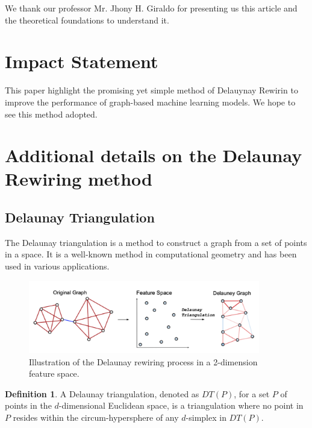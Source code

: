 \documentclass{article}
\theoremstyle{plain}
\theoremstyle{definition}
\newtheorem{definition}[theorem]{Definition}
\theoremstyle{remark}
\begin{document}
We thank our professor Mr. Jhony H. Giraldo for presenting us this article and 
the theoretical foundations to understand it.

\section*{Impact Statement}

This paper highlight the promising yet simple method of Delauynay Rewirin to 
improve the performance of graph-based machine learning models.
We hope to see this method adopted.







\newpage
\appendix
\onecolumn


\section{Additional details on the Delaunay Rewiring method}
\subsection{Delaunay Triangulation}
The Delaunay triangulation is a method to construct a graph from a set of points in a space.
It is a well-known method in computational geometry and has been used in various applications.

\label{app:delaunay}
\begin{figure}[h!]
    \center

    \includegraphics[width=0.9\textwidth]{figures/delaunay_process.png}
    \caption{Illustration of the Delaunay rewiring process in a 2-dimension feature space.}
    \label{fig:delaunay_full}
\end{figure}
\begin{definition}
    \label{def:delaunay}
A Delaunay triangulation, denoted as $DT(P)$, for a set $P$ of points 
        in the $d$-dimensional Euclidean space, is a triangulation where no 
        point in $P$ resides within the circum-hypersphere of any $d$-simplex 
        in $DT(P)$.
    \end{definition}
\end{document}

